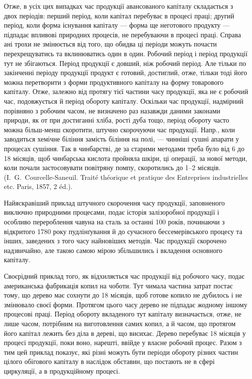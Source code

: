 Отже, в усіх цих випадках час продукції авансованого капіталу складається
з двох періодів: перший період, коли капітал перебуває в процесі
праці; другий період, коли форма існування капіталу — форма ще неготового
продукту — підпадає впливові природних процесів, не перебуваючи
в процесі праці. Справа ані трохи не змінюється від того, що обидва ці
періоди можуть почасти перехрещуватись та вклинюватись один в один.
Робочий період і період продукції тут не збігаються. Період продукції
є довший, ніж робочий період. Але тільки по закінченні періоду продукції
продукт є готовий, достиглий, отже, тільки тоді його можна перетворити
з форми продуктивного капіталу на форму товарового капіталу.
Отже, залежно від протягу тієї частини часу продукції, яка не є
робочий час, подовжується й період обороту капіталу. Оскільки час продукції,
надмірний порівняно з робочим часом, не визначено раз назавжди
даними законами природи, як от при достиганні хліба, рості дуба тощо,
період обороту часто можна більш-менш скоротити, штучно скорочуючи
час продукції. Напр., коли заводиться хемічне біління замість біління
на полі, — чинніші сушні апарати у процесах сушіння. Так в чинбарстві,
де за старими методами треба було від 6 до 18 місяців, щоб
чинбарська кислота пройняла шкіри, ці операції, за нової методи, коли
почали застосовувати повітряну помпу, скоротились до 1--2 місяців.
(I.~G.~Courcelle-Saneuil. Traité théorique et pratique des Entreprises industrielles
etc. Paris, 1857, 2 éd.).

Найяскравіший приклад штучного скорочення часу продукції, заповненого
виключно природними процесами, подає історія залізоробної
продукції і особливо перероблення чавуна на сталь за останні 100 років,
починаючи з відкритого 1780 року пудлінґування й до сучасного бессемерівського
процесу та інших, заведених з того часу найновіших методів.
Час продукції скорочено надзвичайно, але такою самою мірою збільшились
і вкладення основного капіталу.

Своєрідний приклад того, як відхиляється час продукції від робочого
часу, подає американська фабрикація копил на чоботи. Тут чимала частина
затрат постає тому, що дерево має сохнути до 18 місяців, щоб
готове копило не дубилось і не змінювало своєї форми. Протягом цього
часу дерево не підпадає жодному іншому процесові праці. Період обороту
вкладеного тут капіталу визначається, отже, не лише часом, потрібним
на виготовлення самих копил, а й часом, що протягом його капітал
лежить без діла в дереві, що висихає. Дерево перебуває 18 місяців
у процесі продукції, поки воно, нарешті, ввійде у власне робочий процес.
Разом з тим цей приклад показує, які різні можуть бути періоди обороту
різних частин цілого обігового капіталу в наслідок обставин, що постають
не в сфері циркуляції, а в продукційному процесі.

